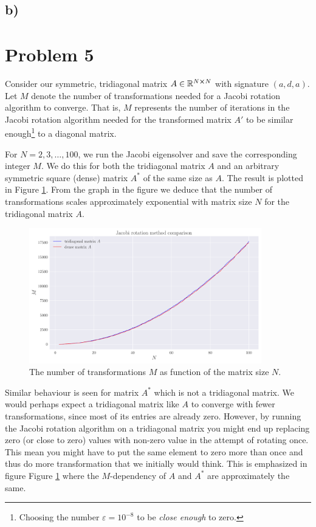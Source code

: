 \documentclass[english,notitlepage,nofootinbib]{revtex4-1}  %
\begin{document}
\subsection*{b)}



\section*{Problem 5}

Consider our symmetric, tridiagonal matrix $A \in \mathbb{R}^{N\cross N}$ with signature $(a,d,a)$. Let $M$ denote the number of transformations needed for a Jacobi rotation algorithm to converge. That is, $M$ represents the number of iterations in the Jacobi rotation algorithm needed for the transformed matrix $A'$ to be similar enough\footnote{Choosing the number $\varepsilon=10^{-8}$ to be \textit{close enough} to zero.} to a diagonal matrix.

For $N=2,3,\dots,100$, we run the Jacobi eigensolver and save the corresponding integer $M$. We do this for both the tridiagonal matrix $A$ and an arbitrary symmetric square (dense) matrix $A^*$ of the same size as $A$. The result is plotted in Figure \ref{fig:p5_transformations_per_N}. From the graph in the figure we deduce that the number of transformations scales approximately exponential with matrix size $N$ for the tridiagonal matrix $A$. 


\begin{figure}[h!]
    \centering
    \includegraphics[width=0.9\textwidth]{jacobi_comparison.pdf}
    \caption{The number of transformations $M$ as function of the matrix size $N$.}\label{fig:p5_transformations_per_N}
\end{figure}

Similar behaviour is seen for matrix $A^*$ which is not a tridiagonal matrix. We would perhaps expect a tridiagonal matrix like $A$ to converge with fewer transformations, since most of its entries are already zero. However, by running the Jacobi rotation algorithm on a tridiagonal matrix you might end up replacing zero (or close to zero) values with non-zero value in the attempt of rotating once. This mean you might have to put the same element to zero more than once and thus do more transformation that we initially would think. This is emphasized in figure Figure \ref{fig:p5_transformations_per_N} where the $M$-dependency of $A$ and $A^*$ are approximately the same.   
\end{document}
